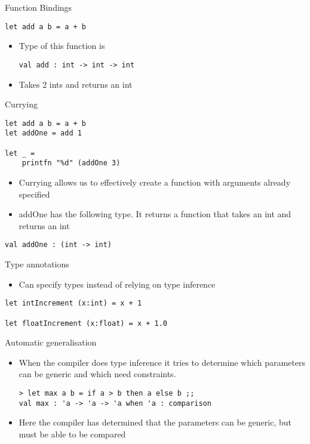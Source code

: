 \documentclass[landscape]{slides}
\begin{document}
\begin{slide}{Function Bindings}
\begin{verbatim}
let add a b = a + b
\end{verbatim}
\begin{itemize}
\item Type of this function is
\begin{verbatim}
val add : int -> int -> int
\end{verbatim}
\item Takes 2 ints and returns an int
\end{itemize}
\end{slide}

\begin{slide}{Currying}
\begin{verbatim}
let add a b = a + b
let addOne = add 1

let _ =
    printfn "%d" (addOne 3)
\end{verbatim}
\begin{itemize}
\item Currying allows us to effectively create a function with arguments already specified
\item addOne has the following type. It returns a function that takes an int and returns an int
\end{itemize}
\begin{verbatim}
val addOne : (int -> int)
\end{verbatim}
\end{slide}

\begin{slide}{Type annotations}
\begin{itemize}
\item Can specify types instead of relying on type inference
\end{itemize}
\begin{verbatim}
let intIncrement (x:int) = x + 1

let floatIncrement (x:float) = x + 1.0
\end{verbatim}
\end{slide}

\begin{slide}{Automatic generalisation}
\begin{itemize}
\item When the compiler does type inference it tries to determine which parameters can be generic and which need constraints.
\begin{verbatim}
> let max a b = if a > b then a else b ;;
val max : 'a -> 'a -> 'a when 'a : comparison
\end{verbatim}
\item Here the compiler has determined that the parameters can be generic, but must be able to be compared
\end{itemize}
\end{slide}
\end{document}
